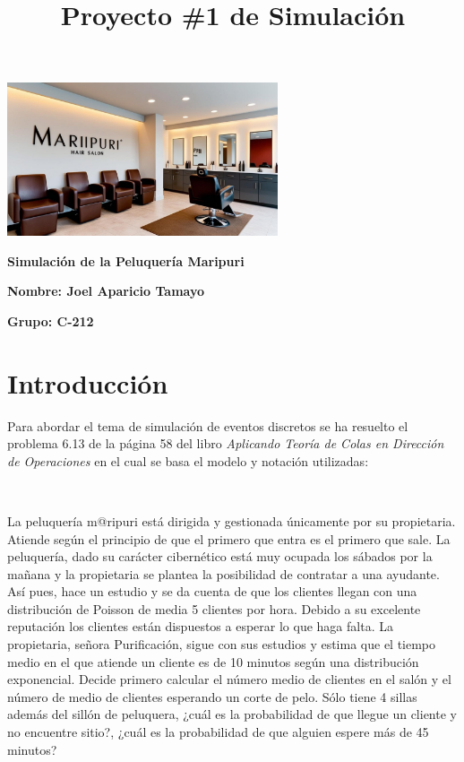 \documentclass{article}
\title{Proyecto \#1 de Simulación}
\author{}
\date{}
\begin{document}
\maketitle

\begin{center}
    \includegraphics[width=0.6\textwidth]{../images/maripuri.jpg}
\end{center}

\vspace{0.5cm}
\begin{center}
    \Large\textbf{Simulación de la Peluquería Maripuri}
\end{center}

\vspace{8cm}
\large\textbf{Nombre: Joel Aparicio Tamayo}

\large\textbf{Grupo: C-212}

\newpage

\section{Introducción}
Para abordar el tema de simulación de eventos discretos se ha resuelto el 
problema 6.13 de la página 58 del libro \textit{Aplicando Teoría de Colas 
en Dirección de Operaciones} en el cual se basa el modelo y notación utilizadas:

\ 

La peluquería m@ripuri está dirigida y gestionada únicamente por su 
propietaria. Atiende según el principio de que el primero que entra es el primero 
que sale. La peluquería, dado su carácter cibernético está muy ocupada los 
sábados por la mañana y la propietaria se plantea la posibilidad de contratar a una 
ayudante. Así pues, hace un estudio y se da cuenta de que los clientes llegan con 
una distribución de Poisson de media 5 clientes por hora. Debido a su excelente 
reputación los clientes están dispuestos a esperar lo que haga falta. La propietaria, 
señora Purificación, sigue con sus estudios y estima que el tiempo medio en el que 
atiende un cliente es de 10 minutos según una distribución exponencial. Decide 
primero calcular el número medio de clientes en el salón y el número de medio de 
clientes esperando un corte de pelo. Sólo tiene 4 sillas además del sillón de 
peluquera, ¿cuál es la probabilidad de que llegue un cliente y no encuentre sitio?, 
¿cuál es la probabilidad de que alguien espere más de 45 minutos?
\end{document}
